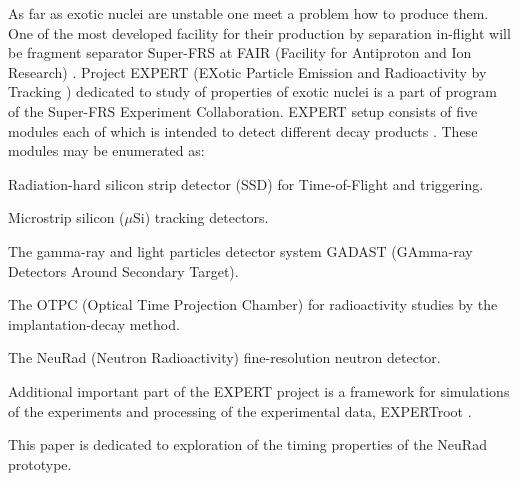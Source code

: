 \documentclass{webofc}
\begin{document}
As far as exotic nuclei are unstable one meet a problem how to produce them.
One of the most developed facility for their production by separation in-flight will be fragment separator Super-FRS at FAIR (Facility for Antiproton and Ion Research) \cite{diplom}. Project EXPERT (EXotic Particle Emission and Radioactivity by Tracking \cite{IMexpert}) dedicated to study of properties of exotic nuclei is a part of program of the Super-FRS Experiment Collaboration. EXPERT setup consists of five modules each of which is intended to detect different decay products \cite{tdr}.
These modules may be enumerated as:
\begin{inparaenum}[(i)]
	\item Radiation-hard silicon strip detector (SSD) for Time-of-Flight and triggering.
	\item Microstrip silicon ($\mu$Si) tracking detectors.
	\item The gamma-ray and light particles detector system GADAST (GAmma-ray Detectors Around Secondary Target).
	\item The OTPC (Optical Time Projection Chamber) for radioactivity studies by the implantation-decay method.
	\item The NeuRad (Neutron Radioactivity) fine-resolution neutron detector.
\end{inparaenum}

Additional important part of the EXPERT project is a framework for simulations of the experiments and processing of the experimental data, EXPERTroot \cite{er}. 

This paper is dedicated to exploration of the timing properties of the NeuRad prototype.
\end{document}
